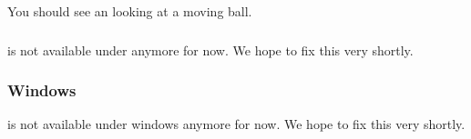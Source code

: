 You should see an \aibo{} looking at a moving ball.

\subsubsection{\macosx{}}

\uwebots{} is not available under \macosx{} anymore for now. We hope to
fix this very shortly.




\subsubsection{Windows}

\uwebots{} is not available under windows anymore for now. We hope to
fix this very shortly.




